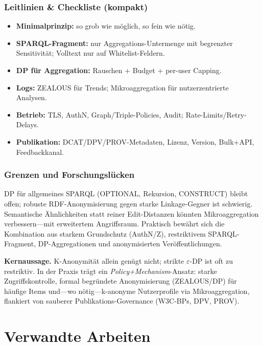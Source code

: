 \subsection{Leitlinien \& Checkliste (kompakt)}
\begin{itemize}
  \item \textbf{Minimalprinzip:} so grob wie möglich, so fein wie nötig.
  \item \textbf{SPARQL-Fragment:} nur Aggregations-Untermenge mit begrenzter Sensitivität; Volltext nur auf Whitelist-Feldern.
  \item \textbf{DP für Aggregation:} Rauschen + Budget + per-user Capping.
  \item \textbf{Logs:} ZEALOUS für Trends; Mikroaggregation für nutzerzentrierte Analysen.
  \item \textbf{Betrieb:} TLS, AuthN, Graph/Triple-Policies, Audit; Rate-Limits/Retry-Delays.
  \item \textbf{Publikation:} DCAT/DPV/PROV-Metadaten, Lizenz, Version, Bulk+API, Feedbackkanal.
\end{itemize}

\subsection{Grenzen und Forschungslücken}
DP für allgemeines SPARQL (OPTIONAL, Rekursion, CONSTRUCT) bleibt offen; robuste RDF-Anonymisierung gegen starke Linkage-Gegner ist schwierig. Semantische Ähnlichkeiten statt reiner Edit-Distanzen könnten Mikroaggregation verbessern—mit erweitertem Angriffsraum. Praktisch bewährt sich die Kombination aus starkem Grundschutz (AuthN/Z), restriktivem SPARQL-Fragment, DP-Aggregationen und anonymisierten Veröffentlichungen.

\medskip
\noindent\textbf{Kernaussage.} K-Anonymität allein genügt nicht; strikte $\varepsilon$-DP ist oft zu restriktiv. In der Praxis trägt ein \emph{Policy+Mechanism}-Ansatz: starke Zugriffskontrolle, formal begründete Anonymisierung (ZEALOUS/DP) für häufige Items und—wo nötig—k-anonyme Nutzerprofile via Mikroaggregation, flankiert von sauberer Publikations-Governance (W3C-BPs, DPV, PROV).












\chapter{Verwandte Arbeiten}
\label{sec:related-work}


